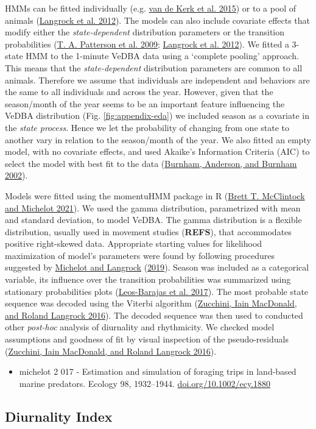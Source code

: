 \documentclass[english,msc,numbers,hidelinks]{coppe}
\providecommand{\tightlist}{%
  \setlength{\itemsep}{0pt}\setlength{\parskip}{0pt}}
\begin{document}
  HMMs can be fitted individually (e.g. \protect\hyperlink{ref-vandekerk2015}{van de Kerk et al. 2015}) or to a pool of animals (\protect\hyperlink{ref-langrock2012}{Langrock et al. 2012}). The models can also include covariate effects that modify either the \emph{state-dependent} distribution parameters or the transition probabilities (\protect\hyperlink{ref-patterson2009}{T. A. Patterson et al. 2009}; \protect\hyperlink{ref-langrock2012}{Langrock et al. 2012}). We fitted a 3-state HMM to the 1-minute VeDBA data using a `complete pooling' approach. This means that the \emph{state-dependent} distribution parameters are common to all animals. Therefore we assume that individuals are independent and behaviors are the same to all individuals and across the year. However, given that the season/month of the year seems to be an important feature influencing the VeDBA distribution (Fig. \ref{fig:appendix-eda}) we included season as a covariate in the \emph{state process}. Hence we let the probability of changing from one state to another vary in relation to the season/month of the year. We also fitted an empty model, with no covariate effects, and used Akaike's Information Criteria (AIC) to select the model with best fit to the data (\protect\hyperlink{ref-burnham2002}{Burnham, Anderson, and Burnham 2002}).

  Models were fitted using the momentuHMM package in R (\protect\hyperlink{ref-mcclintock2021}{Brett T. McClintock and Michelot 2021}). We used the gamma distribution, parametrized with mean and standard deviation, to model VeDBA. The gamma distribution is a flexible distribution, usually used in movement studies (\textbf{REFS}), that accommodates positive right-skewed data. Appropriate starting values for likelihood maximization of model's parameters were found by following procedures suggested by \protect\hyperlink{ref-michelot2019}{Michelot and Langrock} (\protect\hyperlink{ref-michelot2019}{2019}). Season was included as a categorical variable, its influence over the transition probabilities was summarized using stationary probabilities plots (\protect\hyperlink{ref-leosbarajas2017}{Leos-Barajas et al. 2017}). The most probable state sequence was decoded using the Viterbi algorithm (\protect\hyperlink{ref-zucchini2016}{Zucchini, Iain MacDonald, and Roland Langrock 2016}). The decoded sequence was then used to conducted other \emph{post-hoc} analysis of diurnality and rhythmicity. We checked model assumptions and goodness of fit by visual inspection of the pseudo-residuals (\protect\hyperlink{ref-zucchini2016}{Zucchini, Iain MacDonald, and Roland Langrock 2016}).
  \begin{itemize}
  \tightlist
  \item
    michelot 2 017 - Estimation and simulation of foraging trips in land-based marine predators. Ecology 98, 1932--1944. \href{https://doi.org/10.1002/ecy.1880}{doi.org/10.1002/ecy.1880}
  \end{itemize}
  \hypertarget{diurnality-index}{%
  \subsection{Diurnality Index}\label{diurnality-index}}
\end{document}
